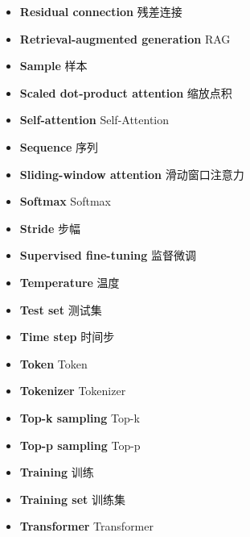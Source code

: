 \begin{itemize}[leftmargin=1.2em,itemsep=2pt,topsep=3pt]
\item {\sffamily\bfseries Residual connection} \quad 残差连接\quad {}
\item {\sffamily\bfseries Retrieval-augmented generation} \quad RAG\quad {}
\item {\sffamily\bfseries Sample} \quad 样本\quad {}
\item {\sffamily\bfseries Scaled dot-product attention} \quad 缩放点积\quad {}
\item {\sffamily\bfseries Self-attention} \quad Self-Attention\quad {}
\item {\sffamily\bfseries Sequence} \quad 序列\quad {}
\item {\sffamily\bfseries Sliding-window attention} \quad 滑动窗口注意力\quad {}
\item {\sffamily\bfseries Softmax} \quad Softmax\quad {}
\item {\sffamily\bfseries Stride} \quad 步幅\quad {}
\item {\sffamily\bfseries Supervised fine-tuning} \quad 监督微调\quad {}
\item {\sffamily\bfseries Temperature} \quad 温度\quad {}
\item {\sffamily\bfseries Test set} \quad 测试集\quad {}
\item {\sffamily\bfseries Time step} \quad 时间步\quad {}
\item {\sffamily\bfseries Token} \quad Token\quad {}
\item {\sffamily\bfseries Tokenizer} \quad Tokenizer\quad {}
\item {\sffamily\bfseries Top-k sampling} \quad Top-k\quad {}
\item {\sffamily\bfseries Top-p sampling} \quad Top-p\quad {}
\item {\sffamily\bfseries Training} \quad 训练\quad {}
\item {\sffamily\bfseries Training set} \quad 训练集\quad {}
\item {\sffamily\bfseries Transformer} \quad Transformer\quad {}

\end{itemize}

